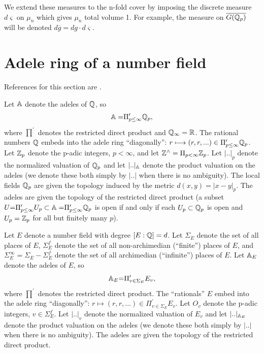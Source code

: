 We extend these measures to the n-fold cover by imposing the discrete
measure $d\varsigma $ on $\mu _n$ which gives $\mu _n$ total volume 1. For
example, the measure on $\overline{G({\Bbb{Q}}_p)}$ will be denoted $d%
\overline{g}=dg\cdot d\varsigma $.

\section{Adele ring of a number field}

References for this section are \cite{W1}.

Let ${\Bbb A}$ denote the adeles of ${\Bbb Q}$, so 
\[
{\Bbb A=}\Pi _{p\leq \infty }^{\prime }{\Bbb Q}_p, 
\]
where $\prod^{\prime }$ denotes the restricted direct product and ${\Bbb Q}%
_\infty ={\Bbb R}$. The rational numbers ${\Bbb Q}$ embeds into the adele
ring ``diagonally'': $r\longmapsto (r,r,...)\in \Pi _{p\leq \infty }^{\prime
}{\Bbb Q}_p$. Let ${\Bbb Z}_p$ denote the p-adic integers, $p<\infty $, and
let ${\Bbb Z}^{\wedge }=\Pi _{p<\infty }{\Bbb Z}_p$. Let $|..|_p$ denote the
normalized valuation of ${\Bbb Q}_p$ and let $|..|_{{\Bbb A}}$ denote the
product valuation on the adeles (we denote these both simply by $|..|$ when
there is no ambiguity). The local fields ${\Bbb Q}_p$ are given the topology
induced by the metric $d(x,y)=|x-y|_p$. The adeles are given the topology of
the restricted direct product (a subset $U{\Bbb =}\Pi _{p\leq \infty
}^{\prime }U_p\subset {\Bbb A=}\Pi _{p\leq \infty }^{\prime }{\Bbb Q}_p$ is
open if and only if each $U_p\subset {\Bbb Q}_p$ is open and $U_p={\Bbb Z}_p$
for all but finitely many $p$).

Let $E$ denote a number field with degree $[E:{\Bbb Q}]=d$. Let $\Sigma _E$
denote the set of all places of $E$, $\Sigma _E^f$ denote the set of all
non-archimedian (``finite'') places of $E$, and $\Sigma _E^\infty
=\Sigma_E-\Sigma _E^f$ denote the set of all archimedian (``infinite'')
places of $E$. Let ${\Bbb A}_E$ denote the adeles of $E$, so 
\[
{\Bbb A}_E{\Bbb =}\Pi _{v\in \Sigma _E}^{\prime }E_v, 
\]
where $\prod^{\prime }$ denotes the restricted direct product. The
``rationals'' $E$ embed into the adele ring ``diagonally'': $r\longmapsto
(r,r,...)\in \Pi _{v\in \Sigma _E}^{\prime }E_v$. Let $O_v$ denote the
p-adic integers, $v\in \Sigma _E^f$. Let $|..|_v$ denote the normalized
valuation of $E_v$ and let $|..|_{{\Bbb A}_E}$ denote the product valuation
on the adeles (we denote these both simply by $|..|$ when there is no
ambiguity). The adeles are given the topology of the restricted direct
product.

